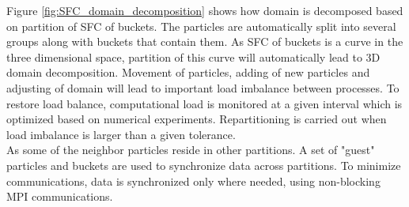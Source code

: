 \documentclass[procedia]{easychair}
\begin{document}
Figure \ref{fig:SFC_domain_decomposition} shows how domain is decomposed based on partition of SFC of buckets. The particles are automatically split into several groups along with buckets that contain them. As SFC of buckets is a curve in the three dimensional space, partition of this curve will automatically lead to 3D domain decomposition. 
Movement of particles, adding of new particles and adjusting of domain will lead to important load imbalance between processes. To restore load balance, computational load is monitored at a given interval which is optimized based on numerical experiments. Repartitioning is carried out when load imbalance is larger than a given tolerance.
\\
As some of the neighbor particles reside in other partitions. A set of "guest" particles and buckets are used to synchronize data across partitions. To minimize communications, data is synchronized only where needed, using non-blocking MPI communications. 
\end{document}
